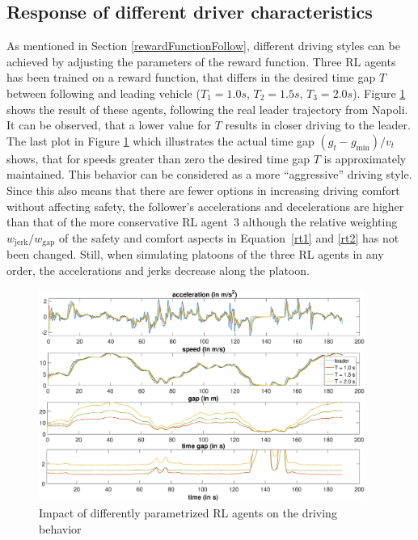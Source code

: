 \documentclass[review]{elsarticle}
\providecommand{\martinc}[1]{}                  %
\providecommand{\sub}[1]{_{\mathrm{#1}}}  %
\providecommand{\3}{{\ss}}
\begin{document}
	
	\subsection{Response of different driver characteristics}
	\label{sec:differentT}
	
	As mentioned in Section \ref{rewardFunctionFollow}, different driving styles
	can be achieved by adjusting the parameters of the reward
	function. Three RL agents has been trained on a reward function, that
	differs in the desired time gap $T$ between following and
	leading vehicle ($T_{1} = 1.0s$, $T_{2} = 1.5s$, 
	$T_{3} =2.0s$). Figure \ref{fig:differentT} shows the result of these agents,
	following the real leader trajectory from Napoli. It can be observed,
	that a lower value for $T$ results in closer driving to the
	leader. The last plot in Figure \ref{fig:differentT} which illustrates the actual time gap $ (g_t-g\sub{min})/v_t$ shows, that for speeds greater than zero the desired time gap $T$ is approximately maintained.
	This behavior can be considered as a more ``aggressive''
	driving style. \martinc{It would be instructive to have a time series
		plot of the actual time gap $g/v$ or $(g-g_0)/v$ (restricted to
		values $<2T$). For the IDM, these
		are somewhat higher in steady state: Analytical expression 
		$T_e(v):=(g_e(v)-g_0)/v=T/\sqrt{1-(v/v_0)^4}$, for the IDM+ $T_e(v)=T$
		for $v<v_0$}
	Since this also means that there are fewer options in
	increasing driving comfort without affecting safety, the follower's
	accelerations and decelerations are higher than that of the more
	conservative RL agent~3 although the relative
	weighting $w\sub{jerk}/w\sub{gap}$ of the safety and comfort aspects in Equation~\eqref{rt1} and \eqref{rt2} has not been
	changed. Still, when simulating platoons of the three RL
	agents in any order, the accelerations and jerks decrease along the
	platoon.
	
	\begin{figure}
		\centering
		\includegraphics[width=0.95\textwidth]{images/differentT}
		\caption{Impact of differently parametrized RL agents
			on the driving behavior }
		\label{fig:differentT}
	\end{figure}
	
\end{document}
